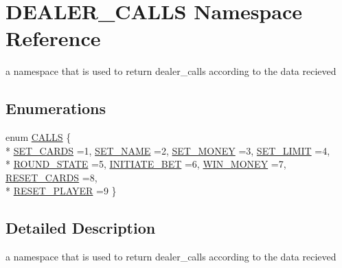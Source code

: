 \hypertarget{namespaceDEALER__CALLS}{\section{D\-E\-A\-L\-E\-R\-\_\-\-C\-A\-L\-L\-S Namespace Reference}
\label{namespaceDEALER__CALLS}
}


a namespace that is used to return dealer\-\_\-calls according to the data recieved  


\subsection*{Enumerations}
\begin{DoxyCompactItemize}
\item 
enum \hyperlink{namespaceDEALER__CALLS_a2f28c146c5dfa6101ca6ea262f0d95ba}{C\-A\-L\-L\-S} \{ \\*
\hyperlink{namespaceDEALER__CALLS_a2f28c146c5dfa6101ca6ea262f0d95baa882bad0a295c8836aaf2f08e9d3a22b8}{S\-E\-T\-\_\-\-C\-A\-R\-D\-S} =1, 
\hyperlink{namespaceDEALER__CALLS_a2f28c146c5dfa6101ca6ea262f0d95baaccdda4a3017d5031cd11179d08476e4b}{S\-E\-T\-\_\-\-N\-A\-M\-E} =2, 
\hyperlink{namespaceDEALER__CALLS_a2f28c146c5dfa6101ca6ea262f0d95baaaa87c98d565cb591900f0606cd170cc5}{S\-E\-T\-\_\-\-M\-O\-N\-E\-Y} =3, 
\hyperlink{namespaceDEALER__CALLS_a2f28c146c5dfa6101ca6ea262f0d95baa5963c56b2097e4c86a8708c0934b79da}{S\-E\-T\-\_\-\-L\-I\-M\-I\-T} =4, 
\\*
\hyperlink{namespaceDEALER__CALLS_a2f28c146c5dfa6101ca6ea262f0d95baab3a2f3281689e63e34bb39ea306ad100}{R\-O\-U\-N\-D\-\_\-\-S\-T\-A\-T\-E} =5, 
\hyperlink{namespaceDEALER__CALLS_a2f28c146c5dfa6101ca6ea262f0d95baa2cb41452c0bcc1048ce66f26c937154b}{I\-N\-I\-T\-I\-A\-T\-E\-\_\-\-B\-E\-T} =6, 
\hyperlink{namespaceDEALER__CALLS_a2f28c146c5dfa6101ca6ea262f0d95baada38e4c50341caa14b35b043dc17f31c}{W\-I\-N\-\_\-\-M\-O\-N\-E\-Y} =7, 
\hyperlink{namespaceDEALER__CALLS_a2f28c146c5dfa6101ca6ea262f0d95baa047961c93c7e2f5b5e42759b7a372d6a}{R\-E\-S\-E\-T\-\_\-\-C\-A\-R\-D\-S} =8, 
\\*
\hyperlink{namespaceDEALER__CALLS_a2f28c146c5dfa6101ca6ea262f0d95baafb6fccae05e55c3ea4ace36eb1463777}{R\-E\-S\-E\-T\-\_\-\-P\-L\-A\-Y\-E\-R} =9
 \}
\end{DoxyCompactItemize}


\subsection{Detailed Description}
a namespace that is used to return dealer\-\_\-calls according to the data recieved 

